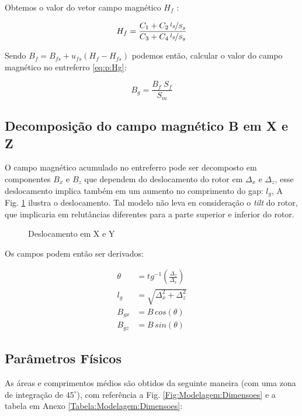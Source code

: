 Obtemos o valor do vetor campo magnético $H_f$ :

\begin{eqnarray}
	H_f = \frac{C_1 + C_2 \, \nicefrac{l_g}{S_g}}{C_3 + C_4 \, \nicefrac{l_g}{S_g}}
\end{eqnarray}

Sendo $B_f = B_{fs} + u_{fs} (H_f-H_{fs})$ podemos então, calcular o valor do campo magnético no entreferro \eqref{eq:p:Hg}:

\begin{equation}
	B_g = \frac{B_f \; S_f}{S_m}
\end{equation}

\subsection{Decomposição do campo magnético B em X e Z} \label{SubSec:CampoX/Y}

O campo magnético acumulado no entreferro pode ser decomposto em componentes $B_x$ e $B_z$ que dependem do deslocamento do rotor em $\Delta_x$ e $\Delta_z$, esse deslocamento implica também em um aumento no comprimento do gap: $l_g$, A Fig. \ref{Fig:modelo:passivo:DxDz} ilustra o deslocamento. Tal modelo não leva en consideração o \textit{tilt} do rotor, que implicaria em relutâncias diferentes para a parte superior e inferior do rotor.

	\begin{figure}[!ht]
		\centering
		\def\svgwidth{0.7\columnwidth}
		
			\caption{Deslocamento em X e Y}
			\label{Fig:modelo:passivo:DxDz}
	\end{figure}

 Os campos podem então ser derivados:
 
 \begin{align}
 	\theta &= tg^{-1}(\frac{\Delta_z}{\Delta_x}) \\
 	l_g &= \sqrt{\Delta_x^2 + \Delta_z^2} \\
 	B_{gx} &= B \, cos(\theta) \\
 	B_{gz} &= B \, sin(\theta) 
 \end{align}

\subsection{Parâmetros Físicos}

As áreas e comprimentos médios são obtidos da seguinte maneira (com uma zona de integração de $45^{\circ}$), com referência a Fig. \ref{Fig:Modelagem:Dimensoes} e a tabela em Anexo \ref{Tabela:Modelagem:Dimensoes}: 

